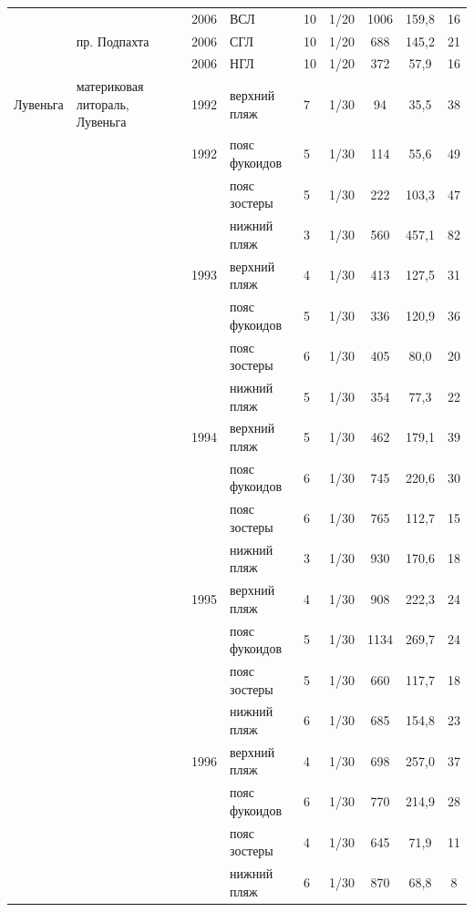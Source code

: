 \begin{footnotesize}
\begin{center}
\begin{longtable}{|p{1.6cm}|p{2.3cm}|p{1cm}|p{2cm}|p{1.5cm}|p{1.3cm}|*{3}{c|}}
		\\ \cline{3-9}
		 &  & 2006 & ВСЛ & 10 & 1/20 & 1006 & 159,8 & 16
		\\ \cline{2-9}
		 & пр. Подпахта & 2006 & СГЛ & 10 & 1/20 & 688 & 145,2 & 21
		\\ \cline{3-9}
		 &  & 2006 & НГЛ & 10 & 1/20 & 372 & 57,9 & 16
		\\ \hline
	Лувеньга & материковая литораль, Лувеньга & 1992 & верхний пляж & 7 & 1/30 & 94 & 35,5 & 38
		\\ \cline{4-9}
		 &  & 1992 & пояс фукоидов & 5 & 1/30 & 114 & 55,6 & 49
		\\ \cline{4-9}
		 &  &  & пояс зостеры & 5 & 1/30 & 222 & 103,3 & 47
		\\ \cline{4-9}
		 &  &  & нижний пляж & 3 & 1/30 & 560 & 457,1 & 82
		\\ \cline{3-9}
		 &  & 1993 & верхний пляж & 4 & 1/30 & 413 & 127,5 & 31
		\\ \cline{4-9}
		 &  &  & пояс фукоидов & 5 & 1/30 & 336 & 120,9 & 36
		\\ \cline{4-9}
		 &  &  & пояс зостеры & 6 & 1/30 & 405 & 80,0 & 20
		\\ \cline{4-9}
		 &  & & нижний пляж & 5 & 1/30 & 354 & 77,3 & 22
		\\ \cline{3-9}
		 &  & 1994 & верхний пляж & 5 & 1/30 & 462 & 179,1 & 39
		\\ \cline{4-9}
		 &  &  & пояс фукоидов & 6 & 1/30 & 745 & 220,6 & 30
		\\ \cline{4-9}
		 &  &  & пояс зостеры & 6 & 1/30 & 765 & 112,7 & 15
		\\ \cline{4-9}
		 &  &  & нижний пляж & 3 & 1/30 & 930 & 170,6 & 18
		\\ \cline{3-9}
		 &  & 1995 & верхний пляж & 4 & 1/30 & 908 & 222,3 & 24
		\\ \cline{4-9}
		 &  &  & пояс фукоидов & 5 & 1/30 & 1134 & 269,7 & 24
		\\ \cline{4-9}
		 &  &  & пояс зостеры & 5 & 1/30 & 660 & 117,7 & 18
		\\ \cline{4-9}
		 &  &  & нижний пляж & 6 & 1/30 & 685 & 154,8 & 23
		\\ \cline{3-9}
		 &  & 1996 & верхний пляж & 4 & 1/30 & 698 & 257,0 & 37
		\\ \cline{4-9}
		 &  &  & пояс фукоидов & 6 & 1/30 & 770 & 214,9 & 28
		\\ \cline{4-9}
		 &  &  & пояс зостеры & 4 & 1/30 & 645 & 71,9 & 11
		\\ \cline{4-9}
		 &  &  & нижний пляж & 6 & 1/30 & 870 & 68,8 & 8

\end{longtable}
\end{center}
\end{footnotesize}
